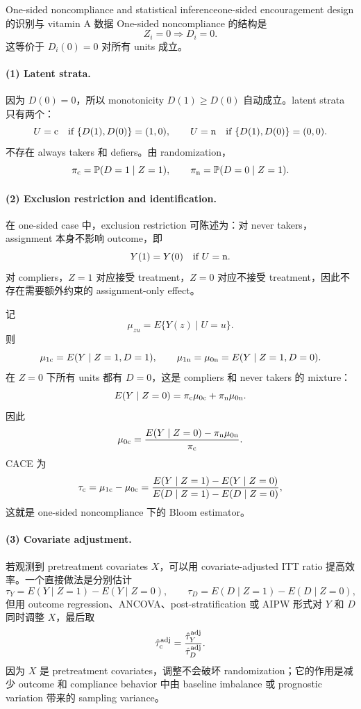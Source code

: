 \begin{exercisesolution}{One-sided noncompliance and statistical inference}{one-sided encouragement design 的识别与 vitamin A 数据}
One-sided noncompliance 的结构是
\[
Z_i=0\Longrightarrow D_i=0.
\]
这等价于 $D_i(0)=0$ 对所有 units 成立。

\paragraph{(1) Latent strata.}
因为 $D(0)=0$，所以 monotonicity $D(1)\geq D(0)$ 自动成立。latent strata 只有两个：
\[
U=\textup{c} \quad \text{if } \{D(1),D(0)\}=(1,0),
\qquad
U=\textup{n} \quad \text{if } \{D(1),D(0)\}=(0,0).
\]
不存在 always takers 和 defiers。由 randomization，
\[
\pi_{\textup{c}}=\mathbb{P}(D=1\mid Z=1),
\qquad
\pi_{\textup{n}}=\mathbb{P}(D=0\mid Z=1).
\]

\paragraph{(2) Exclusion restriction and identification.}
在 one-sided case 中，exclusion restriction 可陈述为：对 never takers，assignment 本身不影响 outcome，即
\[
Y(1)=Y(0)\quad \text{if } U=\textup{n}.
\]
对 compliers，$Z=1$ 对应接受 treatment，$Z=0$ 对应不接受 treatment，因此不存在需要额外约束的 assignment-only effect。

记
\[
\mu_{z u}=E\{Y(z)\mid U=u\}.
\]
则
\[
\mu_{1\textup{c}}=E(Y\mid Z=1,D=1),
\qquad
\mu_{1\textup{n}}=\mu_{0\textup{n}}=E(Y\mid Z=1,D=0).
\]
在 $Z=0$ 下所有 units 都有 $D=0$，这是 compliers 和 never takers 的 mixture：
\[
E(Y\mid Z=0)
=\pi_{\textup{c}}\mu_{0\textup{c}}+\pi_{\textup{n}}\mu_{0\textup{n}}.
\]
因此
\[
\mu_{0\textup{c}}
=
\frac{E(Y\mid Z=0)-\pi_{\textup{n}}\mu_{0\textup{n}}}{\pi_{\textup{c}}}.
\]
CACE 为
\[
\tau_{\textup{c}}=\mu_{1\textup{c}}-\mu_{0\textup{c}}
=
\frac{E(Y\mid Z=1)-E(Y\mid Z=0)}
       {E(D\mid Z=1)-E(D\mid Z=0)},
\]
这就是 one-sided noncompliance 下的 Bloom estimator。

\paragraph{(3) Covariate adjustment.}
若观测到 pretreatment covariates $X$，可以用 covariate-adjusted ITT ratio 提高效率。一个直接做法是分别估计
\[
\tau_Y=E(Y\mid Z=1)-E(Y\mid Z=0),
\qquad
\tau_D=E(D\mid Z=1)-E(D\mid Z=0),
\]
但用 outcome regression、ANCOVA、post-stratification 或 AIPW 形式对 $Y$ 和 $D$ 同时调整 $X$，最后取
\[
\hat\tau_{\textup{c}}^{\mathrm{adj}}=\frac{\hat\tau_Y^{\mathrm{adj}}}{\hat\tau_D^{\mathrm{adj}}}.
\]
因为 $X$ 是 pretreatment covariates，调整不会破坏 randomization；它的作用是减少 outcome 和 compliance behavior 中由 baseline imbalance 或 prognostic variation 带来的 sampling variance。


\end{exercisesolution}

